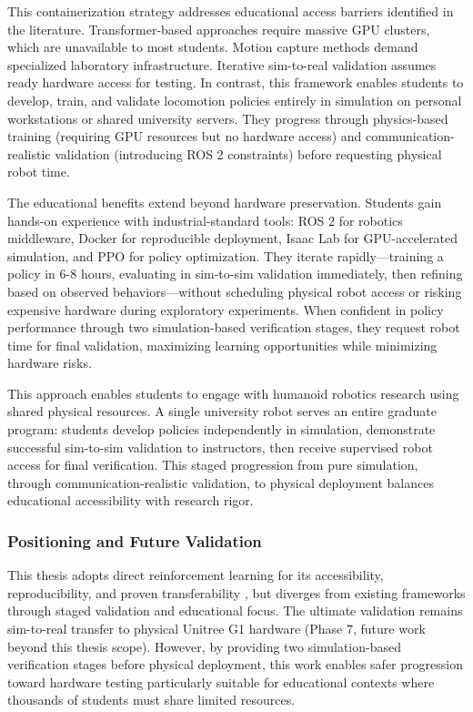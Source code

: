 \documentclass[12pt,a4paper]{article}
\begin{document}
This containerization strategy addresses educational access barriers identified in the literature. Transformer-based approaches \parencite{radosavovic2024realworld} require massive GPU clusters, which are unavailable to most students. Motion capture methods \parencite{cheng2024expressive} demand specialized laboratory infrastructure. Iterative sim-to-real validation assumes ready hardware access for testing. In contrast, this framework enables students to develop, train, and validate locomotion policies entirely in simulation on personal workstations or shared university servers. They progress through physics-based training (requiring GPU resources but no hardware access) and communication-realistic validation (introducing ROS 2 constraints) before requesting physical robot time.

The educational benefits extend beyond hardware preservation. Students gain hands-on experience with industrial-standard tools: ROS 2 for robotics middleware, Docker for reproducible deployment, Isaac Lab for GPU-accelerated simulation, and PPO for policy optimization. They iterate rapidly—training a policy in 6-8 hours, evaluating in sim-to-sim validation immediately, then refining based on observed behaviors—without scheduling physical robot access or risking expensive hardware during exploratory experiments. When confident in policy performance through two simulation-based verification stages, they request robot time for final validation, maximizing learning opportunities while minimizing hardware risks.

This approach enables students to engage with humanoid robotics research using shared physical resources. A single university robot serves an entire graduate program: students develop policies independently in simulation, demonstrate successful sim-to-sim validation to instructors, then receive supervised robot access for final verification. This staged progression from pure simulation, through communication-realistic validation, to physical deployment balances educational accessibility with research rigor.

\subsubsection{Positioning and Future Validation}

This thesis adopts direct reinforcement learning for its accessibility, reproducibility, and proven transferability \parencite{gu2024humanoidgym}, but diverges from existing frameworks through staged validation and educational focus. The ultimate validation remains sim-to-real transfer to physical Unitree G1 hardware (Phase 7, future work beyond this thesis scope). However, by providing two simulation-based verification stages before physical deployment, this work enables safer progression toward hardware testing particularly suitable for educational contexts where thousands of students must share limited resources.
\end{document}
